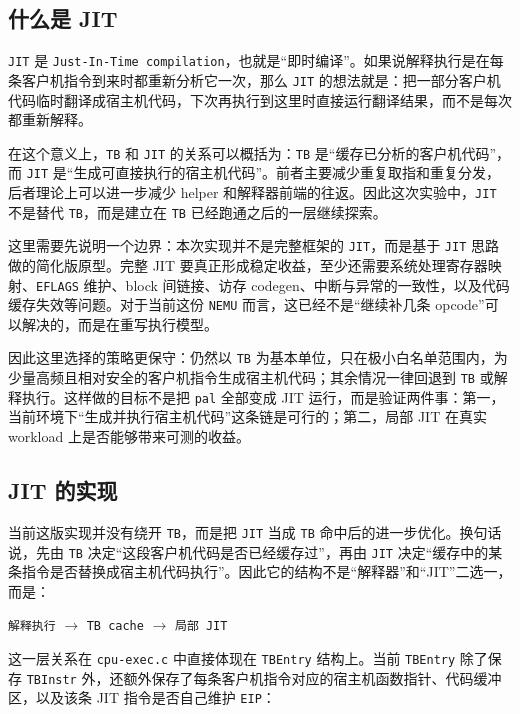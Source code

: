 \documentclass[a4paper]{article}
\begin{document}
\subsection{什么是 JIT}
\texttt{JIT} 是 \texttt{Just-In-Time compilation}，也就是“即时编译”。如果说解释执行是在每条客户机指令到来时都重新分析它一次，那么 \texttt{JIT} 的想法就是：把一部分客户机代码临时翻译成宿主机代码，下次再执行到这里时直接运行翻译结果，而不是每次都重新解释。

在这个意义上，\texttt{TB} 和 \texttt{JIT} 的关系可以概括为：\texttt{TB} 是“缓存已分析的客户机代码”，而 \texttt{JIT} 是“生成可直接执行的宿主机代码”。前者主要减少重复取指和重复分发，后者理论上可以进一步减少 helper 和解释器前端的往返。因此这次实验中，\texttt{JIT} 不是替代 \texttt{TB}，而是建立在 \texttt{TB} 已经跑通之后的一层继续探索。

这里需要先说明一个边界：本次实现并不是完整框架的 \texttt{JIT}，而是基于 \texttt{JIT} 思路做的简化版原型。完整 JIT 要真正形成稳定收益，至少还需要系统处理寄存器映射、\texttt{EFLAGS} 维护、block 间链接、访存 codegen、中断与异常的一致性，以及代码缓存失效等问题。对于当前这份 \texttt{NEMU} 而言，这已经不是“继续补几条 opcode”可以解决的，而是在重写执行模型。

因此这里选择的策略更保守：仍然以 \texttt{TB} 为基本单位，只在极小白名单范围内，为少量高频且相对安全的客户机指令生成宿主机代码；其余情况一律回退到 \texttt{TB} 或解释执行。这样做的目标不是把 \texttt{pal} 全部变成 JIT 运行，而是验证两件事：第一，当前环境下“生成并执行宿主机代码”这条链是可行的；第二，局部 JIT 在真实 workload 上是否能够带来可测的收益。

\subsection{JIT 的实现}
当前这版实现并没有绕开 \texttt{TB}，而是把 \texttt{JIT} 当成 \texttt{TB} 命中后的进一步优化。换句话说，先由 \texttt{TB} 决定“这段客户机代码是否已经缓存过”，再由 \texttt{JIT} 决定“缓存中的某条指令是否替换成宿主机代码执行”。因此它的结构不是“解释器”和“JIT”二选一，而是：

\begin{center}
\texttt{解释执行} $\rightarrow$ \texttt{TB cache} $\rightarrow$ \texttt{局部 JIT}
\end{center}

这一层关系在 \texttt{cpu-exec.c} 中直接体现在 \texttt{TBEntry} 结构上。当前 \texttt{TBEntry} 除了保存 \texttt{TBInstr} 外，还额外保存了每条客户机指令对应的宿主机函数指针、代码缓冲区，以及该条 JIT 指令是否自己维护 \texttt{EIP}：
\end{document}
